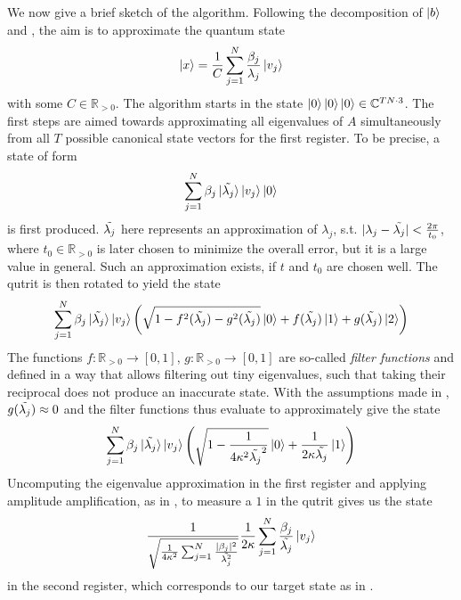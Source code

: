 We now give a brief sketch of the algorithm. Following the decomposition of \(\ket{b}\) and , the aim is to approximate the quantum state
\begin{align}
    \ket{x} = \frac{1}{C} \sum_{j=1}^N \frac{\beta_j}{\lambda_j} \ket{v_j} \label{hhl_target_state}
\end{align}
with some \(C \in \mathbb{R}_{> 0}\). The algorithm starts in the state \(\ket{0}\ket{0}\ket{0} \in \mathbb{C}^{T N \cdot 3}\). The first steps are aimed towards approximating all eigenvalues of \(A\) simultaneously from all \(T\) possible canonical state vectors for the first register. To be precise, a state of form
\begin{align}
    \sum_{j=1}^N \beta_j \ket*{\tilde{\lambda_j}}\ket{v_j}\ket{0}
\end{align}
is first produced. \(\tilde{\lambda_j}\) here represents an approximation of \(\lambda_j\), s.t. \(|\lambda_j - \tilde{\lambda_j}| < \frac{2 \pi}{t_0}\), where \(t_0 \in \mathbb{R}_{> 0}\) is later chosen to minimize the overall error, but it is a large value in general. Such an approximation exists, if \(t\) and \(t_0\) are chosen well. The qutrit is then rotated to yield the state
\begin{align}
    \sum_{j=1}^N \beta_j \ket*{\tilde{\lambda_j}}\ket{v_j}\left(\sqrt{1-f^2(\tilde{\lambda_j})-g^2(\tilde{\lambda_j})}\ket{0}+f(\tilde{\lambda_j})\ket{1}+g(\tilde{\lambda_j})\ket{2}\right)
\end{align}
The functions \(f\colon \mathbb{R}_{> 0} \to [0, 1]\), \(g\colon \mathbb{R}_{> 0} \to [0, 1]\) are so-called \emph{filter functions} and defined in a way that allows filtering out tiny eigenvalues, such that taking their reciprocal does not produce an inaccurate state. With the assumptions made in , \(g(\tilde{\lambda_j}) \approx 0\) and the filter functions thus evaluate to approximately give the state
\begin{align}
    \sum_{j=1}^N \beta_j \ket*{\tilde{\lambda_j}}\ket{v_j}\left(\sqrt{1-\frac{1}{4\kappa^2\tilde{\lambda_j}^2}}\ket{0}+\frac{1}{2\kappa\tilde{\lambda_j}}\ket{1}\right)
\end{align}
Uncomputing the eigenvalue approximation in the first register and applying amplitude amplification, as in , to measure a \(1\) in the qutrit gives us the state
\begin{align}
    \frac{1}{\sqrt{\frac{1}{4\kappa^2} \sum_{j = 1}^N \frac{|\beta_j|^2}{\tilde{\lambda_j^2}}}} \frac{1}{2\kappa} \sum_{j = 1}^N \frac{\beta_j}{\tilde{\lambda_j}} \ket{v_j}
\end{align}
in the second register, which corresponds to our target state as in .

